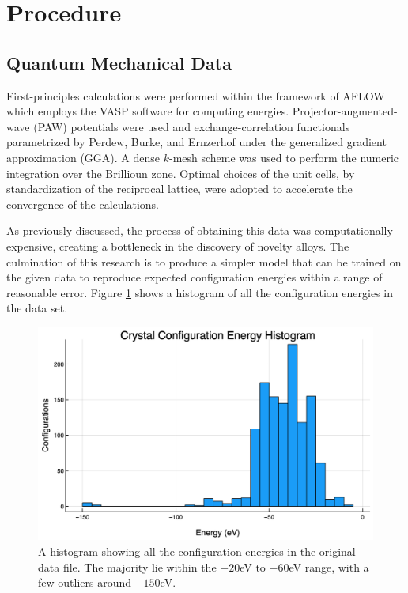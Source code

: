 \section{Procedure} \label{Sect:procedure}
\subsection{Quantum Mechanical Data}\label{Sect:procedureData}
\par First-principles calculations were performed within the framework of AFLOW\cite{} which employs the VASP software for computing energies.\cite{} Projector-augmented-wave (PAW) potentials were used and exchange-correlation functionals parametrized by Perdew, Burke, and Ernzerhof under the generalized gradient approximation (GGA)\cite{}. A dense $k$-mesh scheme was used to perform the numeric integration over the Brillioun zone\cite{}. Optimal choices of the unit cells, by standardization of the reciprocal lattice, were adopted to accelerate the convergence of the calculations.
\par As previously discussed, the process of obtaining this data was computationally expensive, creating a bottleneck in the discovery of novelty alloys. The culmination of this research is to produce a simpler model that can be trained on the given data to reproduce expected configuration energies within a range of reasonable error. Figure \ref{histEnergy} shows a histogram of all the configuration energies in the data set.

\begin{figure}[h]
\includegraphics[scale = 0.3]{Figures/UnitCellEnergies}
\caption{A histogram showing all the configuration energies in the original data file. The majority lie within the $-20$eV to $-60$eV range, with a few outliers around $-150$eV.
\label{histEnergy}} 
\end{figure}


